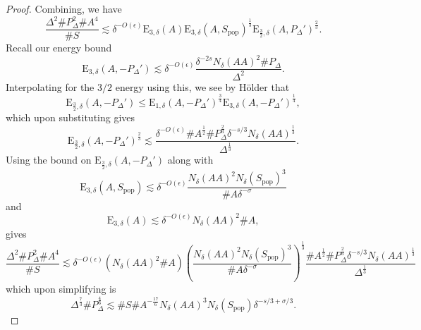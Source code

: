\documentclass[12pt]{amsart}
\newcommand{\1}{\mathbf{1}}
\begin{document}
\begin{proof}
Combining, we have
\[
	\frac{\Delta ^{2} \# P_{\Delta} ^{2} \# A ^{4} }{\# S} \lesssim \delta^{- O(\epsilon)}\mathrm{E} _{3,\delta} (A) \mathrm{E} _{3,\delta} (A,S_{\text{pop}} )^{\frac{1}{3} } \mathrm{E} _{\frac{3}{2}  ,\delta} (A,P_{\Delta} ')^{\frac{2}{3} }
.\]
Recall our energy bound
\[
	\mathrm{E} _{3,\delta} (A,- P_{\Delta} ')\lesssim \delta^{-O(\epsilon)} \frac{\delta^{-2s} N_{\delta} (AA)^{2} \# P_{\Delta} }{\Delta^{2}} 
.\]
Interpolating for the \(3/2\) energy using this, we see by H\"older that
\[
	\mathrm{E} _{\frac{3}{2} ,\delta} (A, - P_{\Delta} ') \leq \mathrm{E} _{1,\delta} (A , - P_{\Delta} ')^{\frac{3}{4} } \mathrm{E} _{3,\delta} (A , - P_{\Delta} ')^{\frac{1}{4} }
,\]
which upon substituting gives
\[
	\mathrm{E} _{\frac{3}{2} ,\delta} (A, -P_{\Delta} ')^{\frac{2}{3} } \lesssim \frac{ \delta^{- O(\epsilon)} \# A^{\frac{1}{2} } \# P_{\Delta} ^{\frac{2}{3} } \delta^{- s / 3} N_{\delta} (AA)^{\frac{1}{3} }}{\Delta^{\frac{1}{3} }} 
.\]
Using the bound on \(\mathrm{E} _{\frac{3}{2} , \delta} (A, - P_{\Delta} ')\) along with
\[
	\mathrm{E}_{3, \delta}\left(A, S_{\mathrm{pop}}\right) \lesssim \delta^{-O(\epsilon)} \frac{N_\delta(A A)^2 N_\delta\left(S_{\mathrm{pop}}\right)^3}{\# A \delta^{-\sigma}}
\]
and
\[
	\mathrm{E}_{3, \delta}(A) \lesssim \delta^{-O(\epsilon)} N_\delta(A A)^2 \# A,
\]
gives
\[
	\frac{\Delta ^{2} \# P_{\Delta} ^{2} \# A ^{4}}{\# S} \lesssim \delta^{- O(\epsilon)} \left( N_\delta(A A)^2 \# A \right) \left( \frac{N_\delta(A A)^2 N_\delta\left(S_{\mathrm{pop}}\right)^3}{\# A \delta^{-\sigma}} \right) ^{\frac{1}{3} }  \frac{ \# A^{\frac{1}{2} } \# P_{\Delta} ^{\frac{2}{3} } \delta^{- s / 3} N_{\delta} (AA)^{\frac{1}{3} }}{\Delta^{\frac{1}{3} }} 
\]
which upon simplifying is
\[
	\Delta ^{\frac{7}{3} } \# P_{\Delta} ^{\frac{4}{3} }  \lesssim \# S\# A ^{- \frac{17}{6} }  N_{\delta} (AA)^{3} N_{\delta} (S_{\text{pop}} )   \delta^{ - s / 3 + \sigma / 3   }
.\]


\end{proof}
\end{document}
